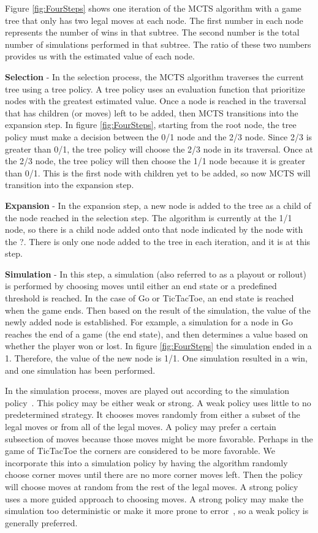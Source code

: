 \documentclass{sig-alternate}
\begin{document}
Figure \ref{fig:FourSteps} shows one iteration of the MCTS algorithm with a game tree that only has two legal moves at each node. The first number in each node represents the number of wins in that subtree. The second number is the total number of simulations performed in that subtree. The ratio of these two numbers provides us with the estimated value of each node.

\textbf{Selection} - In the selection process, the MCTS algorithm traverses the current tree using a tree policy. A tree policy uses an evaluation function that prioritize nodes with the greatest estimated value. Once a node is reached in the traversal that has children (or moves) left to be added, then MCTS transitions into the expansion step. In figure \ref{fig:FourSteps}, starting from the root node, the tree policy must make a decision between the 0/1 node and the 2/3 node. Since 2/3 is greater than 0/1, the tree policy will choose the 2/3 node in its traversal. Once at the 2/3 node, the tree policy will then choose the 1/1 node because it is greater than 0/1. This is the first node with children yet to be added, so now MCTS will transition into the expansion step.

\textbf{Expansion} - In the expansion step, a new node is added to the tree as a child of the node reached in the selection step. The algorithm is currently at the 1/1 node, so there is a child node added onto that node indicated by the node with the ?. There is only one node added to the tree in each iteration, and it is at this step.

\textbf{Simulation} - In this step, a simulation (also referred to as a playout or rollout) is performed by choosing moves until either an end state or a predefined threshold is reached. In the case of Go or TicTacToe, an end state is reached when the game ends. Then based on the result of the simulation, the value of the newly added node is established. For example, a simulation for a node in Go reaches the end of a game (the end state), and then determines a value based on whether the player won or lost. In figure \ref{fig:FourSteps} the simulation ended in a 1. Therefore, the value of the new node is 1/1. One simulation resulted in a win, and one simulation has been performed.

In the simulation process, moves are played out according to the simulation policy~\cite{ActionSelection}. This policy may be either weak or strong. A weak policy uses little to no predetermined strategy. It chooses moves randomly from either a subset of the legal moves or from all of the legal moves. A policy may prefer a certain subsection of moves because those moves might be more favorable. Perhaps in the game of TicTacToe the corners are considered to be more favorable. We incorporate this into a simulation policy by having the algorithm randomly choose corner moves until there are no more corner moves left. Then the policy will choose moves at random from the rest of the legal moves. A strong policy uses a more guided approach to choosing moves. A strong policy may make the simulation too deterministic or make it more prone to error~\cite{TheGrandChallenge}, so a weak policy is generally preferred. 
\end{document}
